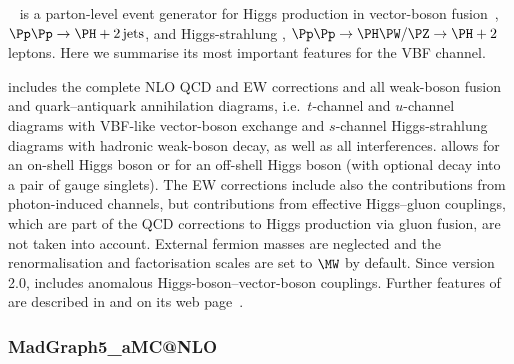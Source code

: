 \HAWK{}~\cite{Denner:2014cla,HAWK} 
is a parton-level event generator for Higgs production in
vector-boson fusion~\cite{Ciccolini:2007jr, Ciccolini:2007ec},
$\Pp\Pp\to\PH+2\,\mathrm{jets}$, and Higgs-strahlung \cite{Denner:2011id},
$\Pp\Pp\to\PH\PW/\PZ\to \PH+2\,$leptons.
Here we summarise its most important features for the VBF channel. 

\HAWK{}
includes the complete NLO QCD and EW corrections and all weak-boson
fusion and quark--antiquark annihilation diagrams, i.e.~$t$-channel
and $u$-channel diagrams with VBF-like vector-boson exchange and
$s$-channel Higgs-strahlung diagrams with hadronic weak-boson decay,
as well as all interferences. 
\HAWK{} allows for an on-shell Higgs boson or for an off-shell Higgs
boson (with optional decay into a pair of gauge singlets).
The EW corrections include also the contributions from photon-induced
channels, but contributions from effective Higgs--gluon couplings,
which are part of the QCD corrections to Higgs production via
gluon fusion,
are not taken into account.
External fermion masses are neglected
and the renormalisation and factorisation scales are set to $\MW$ by
default. Since version 2.0, \HAWK{} includes
anomalous Higgs-boson--vector-boson couplings.
Further features of \HAWK{} are described in 
and on its web page~\cite{HAWK}.

\subsubsection{MadGraph5\_aMC@NLO}
\label{sec:aMCNLO-sub-sub-VBF}

